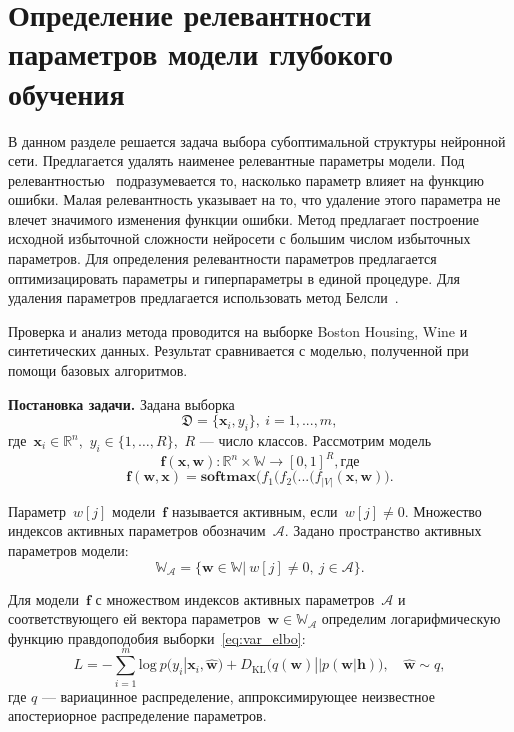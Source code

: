 





























\section{Определение релевантности параметров модели глубокого обучения}
В данном разделе решается задача выбора субоптимальной структуры нейронной сети. Предлагается удалять наименее релевантные параметры модели. Под релевантностью~\cite{nips} подразумевается то, насколько параметр влияет на функцию ошибки. Малая релевантность указывает на то, что удаление этого параметра не влечет значимого изменения функции ошибки. Метод предлагает построение исходной избыточной сложности нейросети с большим числом избыточных параметров. Для определения релевантности параметров предлагается оптимизацировать параметры и гиперпараметры в единой процедуре. Для удаления параметров предлагается использовать метод Белсли~\cite{neychev}.

Проверка и анализ метода проводится на выборке Boston Housing, Wine и синтетических данных. Результат сравнивается с моделью, полученной при помощи базовых алгоритмов.

\textbf{Постановка задачи. } 
Задана выборка
$$\mathfrak{D} = \{\textbf{x}_i,y_i\},~ i =1,...,m,$$
где~$\textbf{x}_i \in \mathbb{R}^{n}$,~$y_i \in \{1, \dots, R\}$,~$R$ --- число классов.
Рассмотрим модель~$$\mathbf{f}(\mathbf{x}, \mathbf{w}): \mathbb{R}^n \times \mathbb{W} \to [0,1]^R, где$$
$$\mathbf{f}(\mathbf{w}, \mathbf{x}) = \textbf{softmax}\bigl( f_1(f_2(...(f_{|V|}(\mathbf{x}, \mathbf{w})\bigr).$$

Параметр~$w[j]$ модели~$\mathbf{f}$  называется активным, если~$w[j] \not = 0$. Множество индексов активных параметров обозначим~$\mathcal{A}$.
Задано пространство активных параметров модели:
$$\mathbb{W}_{\mathcal{A}} = \{ \textbf{w} \in \mathbb{W}|~w[j]\not=0,~j \in \mathcal{A}  \}.$$


Для модели~$\mathbf{f}$ с множеством индексов активных параметров~$\mathcal{A}$ и соответствующего ей вектора параметров~$\textbf{w} \in \mathbb{W_\mathcal{A}}$  определим логарифмическую функцию правдоподобия выборки~\eqref{eq:var_elbo}:
\begin{equation}
\label{eq:applied_elbo}
    L = -\sum_{i=1}^m \text{log}~p({y}_i|\mathbf{x}_i, \hat{\mathbf{w}}) + D_\text{KL}\bigl(q (\mathbf{w}) || p (\mathbf{w}|\mathbf{h})\bigr),\quad \hat{\mathbf{w}} \sim q,
\end{equation}
где $q$ --- вариацинное распределение, аппроксимирующее неизвестное апостериорное распределение параметров.


